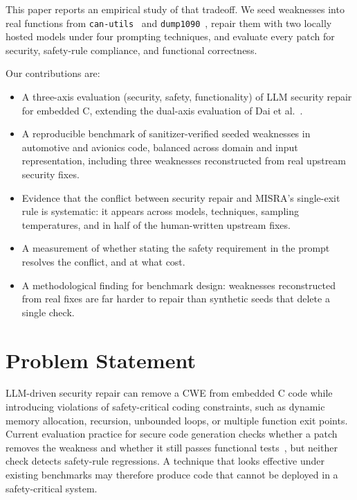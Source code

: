 \documentclass[12pt]{IEEEtran}
\begin{document}
This paper reports an empirical study of that tradeoff. We seed  weaknesses into real functions from \texttt{can-utils}~\cite{canutils} and \texttt{dump1090}~\cite{dump1090}, repair them with two locally hosted models under four prompting techniques, and evaluate every patch for security, safety-rule compliance, and functional correctness.

Our contributions are:
\begin{itemize}
    \item A three-axis evaluation (security, safety, functionality) of LLM security repair for embedded C, extending the dual-axis evaluation of Dai et al.~\cite{rethinking2026}.
    \item A reproducible benchmark of  sanitizer-verified seeded weaknesses in automotive and avionics code, balanced across domain and input representation, including three weaknesses reconstructed from real upstream security fixes.
    \item Evidence that the conflict between security repair and MISRA's single-exit rule is systematic: it appears across models, techniques, sampling temperatures, and in half of the human-written upstream fixes.
    \item A measurement of whether stating the safety requirement in the prompt resolves the conflict, and at what cost.
    \item A methodological finding for benchmark design: weaknesses reconstructed from real fixes are far harder to repair than synthetic seeds that delete a single check.
\end{itemize}

\section{Problem Statement}
LLM-driven security repair can remove a CWE from embedded C code while introducing violations of safety-critical coding constraints, such as dynamic memory allocation, recursion, unbounded loops, or multiple function exit points. Current evaluation practice for secure code generation checks whether a patch removes the weakness and whether it still passes functional tests~\cite{rethinking2026, peng2025cweval}, but neither check detects safety-rule regressions. A technique that looks effective under existing benchmarks may therefore produce code that cannot be deployed in a safety-critical system.
\end{document}
